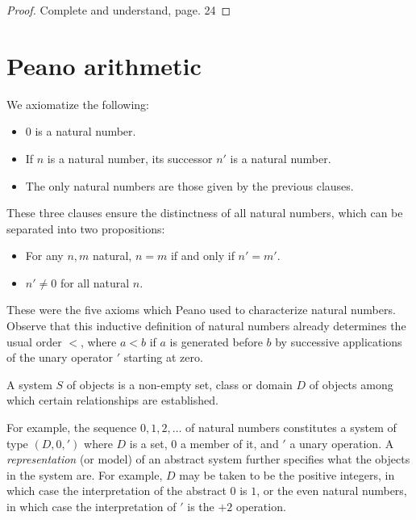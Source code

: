 \documentclass[a4paper, 12pt]{article}
\newtheorem{proof}{Proof}
\begin{document}
\begin{proof}
    Complete and understand, page. 24
\end{proof}

\pagebreak 

\section{Peano arithmetic}

We axiomatize the following:

\begin{itemize}
    \item $0$ is a natural number.
    \item If $n$ is a natural number, its successor $n'$ is a natural number.
    \item The only natural numbers are those given by the previous clauses.
\end{itemize}

These three clauses ensure the distinctness of all natural numbers, which 
can be separated into two propositions:

\begin{itemize}
    \item For any $n, m$ natural, $n = m$ if and only if $n' = m'$.
    \item $n' \neq 0$ for all natural $n$.
\end{itemize}

These were the five axioms which Peano used to characterize natural numbers. 
Observe that this inductive definition of natural numbers already determines 
the usual order $<$, where $a < b$ if $a$ is generated before $b$ by successive 
applications of the unary operator $'$ starting at zero.

\begin{definition}
    A system $S$ of objects is a non-empty set, class or domain $D$ of 
    objects among which certain relationships are established.
\end{definition}

For example, the sequence $0, 1, 2, \ldots$ of natural numbers 
constitutes a system of type $(D, 0, ')$ where $D$ is a set,
$0$ a member of it, and $'$ a unary operation. A \textit{representation}
(or model) of an abstract system further specifies what the 
objects in the system are. For example, $D$ may be taken to 
be the positive integers, in which case the interpretation of the 
abstract $0$ is $1$, or the even natural numbers, in which case the 
interpretation of $'$ is the $+2$ operation.
\end{document}
